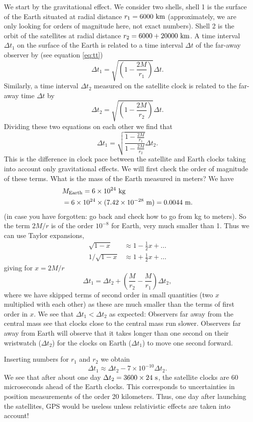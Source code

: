 {\begin{multicols}{2}
We start by the gravitational effect. We consider two shells, shell 1 is the surface of the Earth situated at radial distance $r_1=6000{\rm\ km}$ (approximately, we are only looking for orders of magnitude here, not exact numbers). Shell 2 is the orbit of the satellites at radial distance $r_2=6000 + 20000 {\rm\ km}$. A time interval $\Delta t_1$ on the surface of the Earth is related to a time interval $\Delta t$ of the far-away observer by (see equation \ref{eq:tt})
\[
\Delta t_1=\sqrt{\left(1-\frac{2M}{r_1}\right)}\Delta t.
\]
Similarly, a time interval $\Delta t_2$ measured on the satellite clock is related to the far-away time $\Delta t$ by
\[
\Delta t_2=\sqrt{\left(1-\frac{2M}{r_2}\right)}\Delta t.
\]
Dividing these two equations on each other we find that
\[
\Delta t_1=\sqrt{\frac{1-\frac{2M}{r_1}}{1-\frac{2M}{r_2}}}\Delta t_2.
\]
This is the difference in clock pace between the satellite and Earth clocks taking into account only gravitational effects. We will first check the order of magnitude of these terms. What is the mass of the Earth measured in meters? We have 
\begin{align*}
&M_{\rm Earth}=6\times10^{24}{\rm\ kg}\\
&=6\times10^{24}\times(7.42\times10^{-28}{\rm\ m})=0.0044 {\rm\ m}.
\end{align*}
(in case you have forgotten: go back and check how to go from kg to meters). So the term $2M/r$ is of the order $10^{-8}$ for Earth, very much smaller than 1. Thus we can use Taylor expansions,
\begin{align*}
\sqrt{1-x}&\approx1-\frac{1}{2}x+...\\
1/\sqrt{1-x}&\approx1+\frac{1}{2}x+...
\end{align*}
giving for $x=2M/r$
\[
\Delta t_1=\Delta t_2+\left(\frac{M}{r_2}-\frac{M}{r_1}\right)\Delta t_2,
\]
where we have skipped terms of second order in small quantities (two $x$ multiplied with each other) as these are much smaller than the terms of first order in $x$. We see that $\Delta t_1<\Delta t_2$ as expected: Observers far away from the central mass see that clocks close to the central mass run slower. Observers far away from Earth will observe that it takes longer than one second on their wristwatch ($\Delta t_2$) for the clocks on Earth ($\Delta t_1$) to move one second forward.

Inserting numbers for $r_1$ and $r_2$ we obtain
\[
\Delta t_1\approx\Delta t_2-7\times10^{-10}\Delta t_2.
\]
We see that after about one day $\Delta t_2=3600\times24{\rm\ s}$, the satellite clocks are 60 microseconds ahead of the Earth clocks. This corresponds to uncertainties in position measurements of the order 20 kilometers. Thus, one day after launching the satellites, GPS would be useless unless relativistic effects are taken into account!


\end{multicols}}

